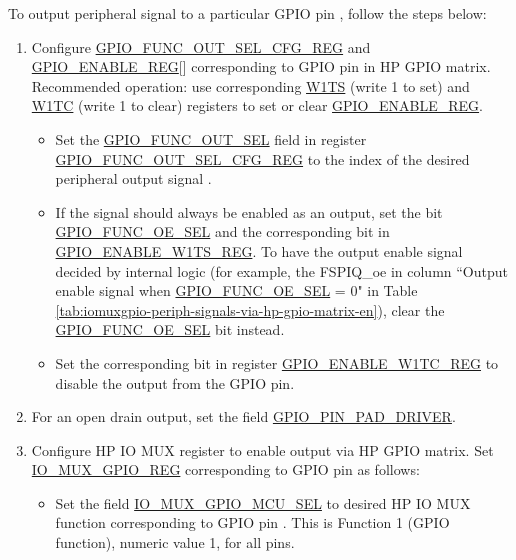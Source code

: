 \documentclass[main\_\_EN.tex]{subfiles}
\begin{document}
To output peripheral signal  to a particular GPIO pin , follow the steps below:

\begin{enumerate}
    \item Configure \hyperref[regdesc:GPIOFUNCNOUTSELCFGREG]{GPIO\_FUNC\_OUT\_SEL\_CFG\_REG} and  \hyperref[regdesc:GPIOENABLEREG]{GPIO\_ENABLE\_REG}[] corresponding to GPIO pin  in HP GPIO matrix. Recommended operation: use corresponding \hyperref[regdesc:GPIOENABLEW1TSREG]{W1TS} (write 1 to set) and \hyperref[regdesc:GPIOENABLEW1TCREG]{W1TC} (write 1 to clear) registers to set or clear \hyperref[regdesc:GPIOENABLEREG]{GPIO\_ENABLE\_REG}.


    \begin{itemize}
        \item Set the \hyperref[fielddesc:GPIOFUNCNOUTSEL]{GPIO\_FUNC\_OUT\_SEL} field in register \hyperref[regdesc:GPIOFUNCNOUTSELCFGREG]{GPIO\_FUNC\_OUT\_SEL\_CFG\_REG} to the index of the desired peripheral output signal .
        \item If the signal should always be enabled as an output, set the bit \hyperref[fielddesc:GPIOFUNCNOESEL]{GPIO\_FUNC\_OE\_SEL} and the corresponding bit in \hyperref[regdesc:GPIOENABLEW1TSREG]{GPIO\_ENABLE\_W1TS\_REG}. To have the output enable signal decided by internal logic (for example, the FSPIQ\_oe in column ``Output enable signal when \hyperref[fielddesc:GPIOFUNCNOESEL]{GPIO\_FUNC\_OE\_SEL} = 0" in Table \ref{tab:iomuxgpio-periph-signals-via-hp-gpio-matrix-en}), clear the \hyperref[fielddesc:GPIOFUNCNOESEL]{GPIO\_FUNC\_OE\_SEL} bit instead.
       \item Set the corresponding bit in register \hyperref[regdesc:GPIOENABLEW1TCREG]{GPIO\_ENABLE\_W1TC\_REG} to disable the output from the GPIO pin.
    \end{itemize}
    \item For an open drain output, set the field \hyperref[fielddesc:GPIOPINNPADDRIVER]{GPIO\_PIN\_PAD\_DRIVER}.
    \item Configure HP IO MUX register to enable output via HP GPIO matrix. Set \hyperref[regdesc:IOMUXGPIONREG]{IO\_MUX\_GPIO\_REG} corresponding to GPIO pin  as follows:
    \begin{itemize}
        \item Set the field \hyperref[fielddesc:IOMUXGPIONMCUSEL]{IO\_MUX\_GPIO\_MCU\_SEL} to desired HP IO MUX function corresponding to GPIO pin . This is Function 1 (GPIO function), numeric value 1, for all pins.

\end{itemize}
\end{enumerate}
\end{document}
